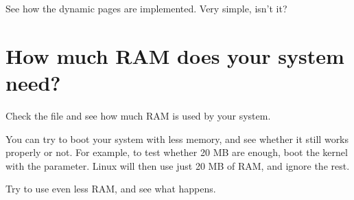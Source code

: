 See how the dynamic pages are implemented. Very simple, isn't it?

\section{How much RAM does your system need?}

Check the  file and see how much RAM is used by your
system.

You can try to boot your system with less memory, and see whether it
still works properly or not. For example, to test whether 20 MB are
enough, boot the kernel with the  parameter. Linux will then
use just 20 MB of RAM, and ignore the rest.

Try to use even less RAM, and see what happens.
